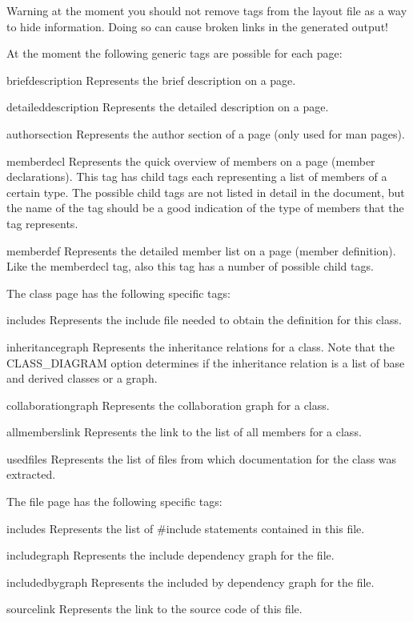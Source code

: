 \begin{DoxyWarning}{Warning}
at the moment you should not remove tags from the layout file as a way to hide information. Doing so can cause broken links in the generated output!
\end{DoxyWarning}
At the moment the following generic tags are possible for each page: 
\begin{DoxyDescription}
\item[{\ttfamily briefdescription} ]Represents the brief description on a page. 
\item[{\ttfamily detaileddescription} ]Represents the detailed description on a page. 
\item[{\ttfamily authorsection} ]Represents the author section of a page (only used for man pages). 
\item[{\ttfamily memberdecl} ]Represents the quick overview of members on a page (member declarations). This tag has child tags each representing a list of members of a certain type. The possible child tags are not listed in detail in the document, but the name of the tag should be a good indication of the type of members that the tag represents. 
\item[{\ttfamily memberdef} ]Represents the detailed member list on a page (member definition). Like the {\ttfamily memberdecl} tag, also this tag has a number of possible child tags. 
\end{DoxyDescription}

The class page has the following specific tags: 
\begin{DoxyDescription}
\item[{\ttfamily includes} ]Represents the include file needed to obtain the definition for this class. 
\item[{\ttfamily inheritancegraph} ]Represents the inheritance relations for a class. Note that the CLASS\_\-DIAGRAM option determines if the inheritance relation is a list of base and derived classes or a graph. 
\item[{\ttfamily collaborationgraph} ]Represents the collaboration graph for a class. 
\item[{\ttfamily allmemberslink} ]Represents the link to the list of all members for a class. 
\item[{\ttfamily usedfiles} ]Represents the list of files from which documentation for the class was extracted. 
\end{DoxyDescription}

The file page has the following specific tags: 
\begin{DoxyDescription}
\item[{\ttfamily includes} ]Represents the list of \#include statements contained in this file. 
\item[{\ttfamily includegraph} ]Represents the include dependency graph for the file. 
\item[{\ttfamily includedbygraph} ]Represents the included by dependency graph for the file. 
\item[{\ttfamily sourcelink} ]Represents the link to the source code of this file. 
\end{DoxyDescription}

